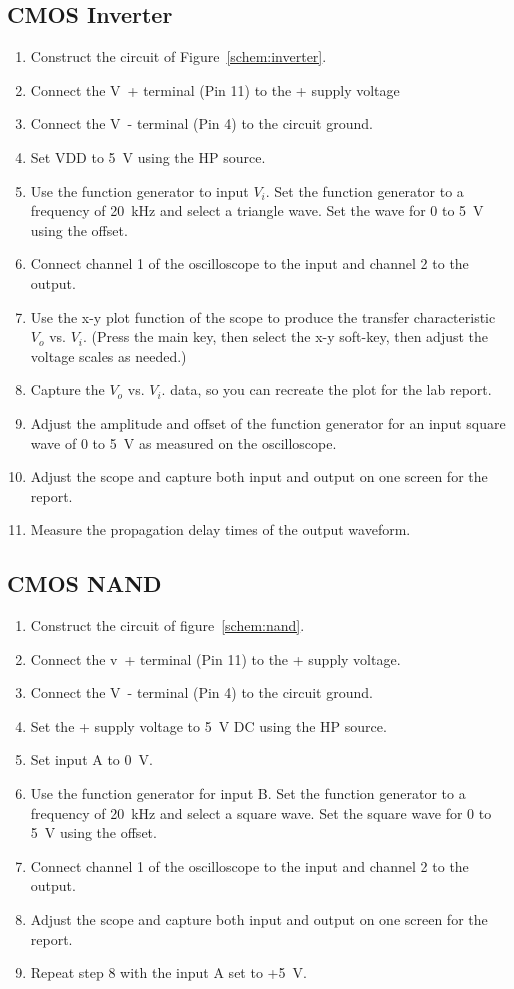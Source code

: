 \subsection{CMOS Inverter}
\label{sec:inverter}

\begin{enumerate}
\item Construct the circuit of Figure~\ref{schem:inverter}.
\item Connect the \si{V+} terminal (Pin 11) to the + supply voltage
\item Connect the \si{V-} terminal (Pin 4) to the circuit ground.
\item Set VDD to \SI{5}{V} using the HP source.
\item Use the function generator to input $V_i$. Set the function generator to a frequency of \SI{20}{kHz} and select a triangle wave. Set the wave for 0 to \SI{5}{V} using the offset.
\item Connect channel 1 of the oscilloscope to the input and channel 2 to the output.
\item Use the x-y plot function of the scope to produce the transfer characteristic $V_o$ vs. $V_i$. (Press the main key, then select the x-y soft-key, then adjust the voltage scales as needed.)
\item Capture the $V_o$ vs. $V_i$.  data, so you can recreate the plot for the lab report.
\item Adjust the amplitude and offset of the function generator for an input square wave of 0 to \SI{5}{V} as measured on the oscilloscope.
\item Adjust the scope and capture both input and output on one screen for the report.
\item Measure the propagation delay times of the output waveform.
\end{enumerate}

\subsection{CMOS NAND}
\label{sec:nand}

\begin{enumerate}
\item Construct the circuit of figure~\ref{schem:nand}.
\item Connect the \si{v+} terminal (Pin 11) to the + supply voltage.
\item Connect the \si{V-} terminal (Pin 4) to the circuit ground.
\item Set the + supply voltage to \SI{5}{V} DC using the HP source.
\item Set input A to \SI{0}{V}.
\item Use the function generator for input B. Set the function generator to a frequency of \SI{20}{kHz} and select a square wave. Set the square wave for 0 to \SI{5}{V} using the offset.
\item Connect channel 1 of the oscilloscope to the input and channel 2 to the output.
\item Adjust the scope and capture both input and output on one screen for the report.
\item Repeat step 8 with the input A set to +\SI{5}{V}.
\end{enumerate}

